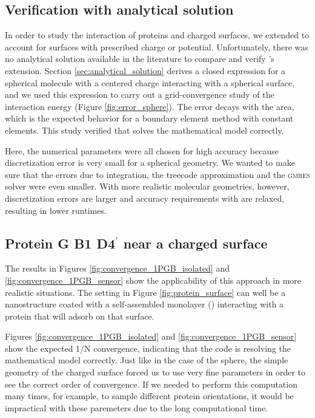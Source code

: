
\subsection{Verification with analytical solution} \label{sec:disc_analytical}
In order to study the interaction of proteins and charged surfaces, we extended \pygbe to account for surfaces with prescribed charge or potential. Unfortunately, there was no analytical solution available in the literature to compare and verify \pygbe's extension. Section \ref{sec:analytical_solution} derives a closed expression for a spherical molecule with a centered charge interacting with a spherical surface, and we used this expression to carry out a grid-convergence study of the interaction energy (Figure \ref{fig:error_sphere}). The error decays with the area, which is the expected behavior \cite{CooperBardhanBarba2013, CooperBarba-share154331} for a boundary element method with constant elements. This study verified that \pygbe solves the mathematical model correctly.

Here, the numerical parameters were all chosen for high accuracy because  discretization error is very small for a spherical geometry. We wanted to make sure that the errors due to integration, the treecode approximation and the \textsc{gmres} solver were even smaller. With more realistic molecular geometries, however, discretization errors are larger and accuracy requirements with \pygbe are relaxed, resulting in lower runtimes.

\subsection{Protein G B1 D4$^\prime$ near a charged surface} \label{sec:disc_1PGB}

The results in Figures \ref{fig:convergence_1PGB_isolated} and \ref{fig:convergence_1PGB_sensor} show the applicability of this approach in more realistic situations. The setting in Figure \ref{fig:protein_surface} can well be a nanostructure coated with a self-assembled monolayer (\sam) interacting with a protein that will adsorb on that surface.

Figures \ref{fig:convergence_1PGB_isolated} and \ref{fig:convergence_1PGB_sensor} show the expected 1/N convergence, indicating that the code is resolving the mathematical model correctly. Just like in the case of the sphere, the simple geometry of the charged surface forced us to use very fine parameters in order to see the correct order of convergence. If we needed to perform this computation many times, for example, to sample different protein orientations, it would be impractical with these paremeters due to the long computational time. 

